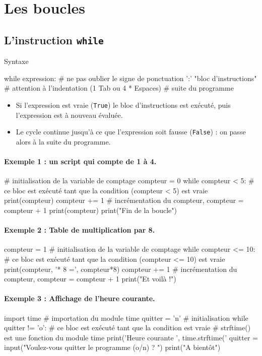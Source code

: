 \documentclass[%
oneside,                 %
final,                   %
10pt]{article}
\begin{document}
\section{Les boucles}
\subsection{L'instruction \texttt{while} }

\begin{block}{Syntaxe }

\bpycod
while expression:           # ne pas oublier le signe de ponctuation ':'
    "bloc d'instructions"   # attention à l'indentation (1 Tab ou 4 * Espaces)
# suite du programme
\epycod
\begin{itemize}
\item Si l'expression est vraie (\texttt{True}) le bloc d'instructions est exécuté, puis l'expression est à nouveau évaluée.

\item Le cycle continue jusqu'à ce que l'expression soit fausse (\texttt{False}) : on passe alors à la suite du programme.
\end{itemize}

\noindent
\end{block}
\paragraph{Exemple 1 : un script qui compte de 1 à 4.}
\bpycod
# initialisation de la variable de comptage
compteur = 0
while compteur < 5:
    # ce bloc est exécuté tant que la condition (compteur < 5) est vraie
    print(compteur)
    compteur +=  1    # incrémentation du compteur,  compteur = compteur + 1
print(compteur)
print("Fin de la boucle")
\epycod
\paragraph{Exemple 2 : Table de multiplication par 8.}
\bpycod
compteur = 1         # initialisation de la variable de comptage
while compteur <= 10:
    # ce bloc est exécuté tant que la condition (compteur <= 10) est vraie
    print(compteur, '* 8 =', compteur*8)
    compteur += 1    # incrémentation du compteur, compteur = compteur + 1
print("Et voilà !")
\epycod
\paragraph{Exemple 3 : Affichage de l'heure courante.}
\bpycod
import time     # importation du module time
quitter = 'n'   # initialisation
while quitter != 'o':
    # ce bloc est exécuté tant que la condition est vraie
    # strftime() est une fonction du module time
    print('Heure courante ', time.strftime('%
    quitter = input("Voulez-vous quitter le programme (o/n) ? ")
print("A bientôt")
\epycod
\end{document}
